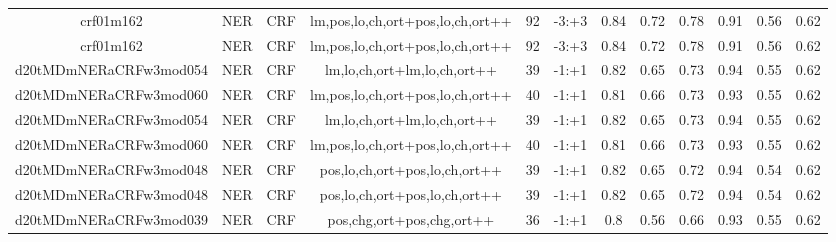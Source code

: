 \documentclass[a4paper]{article}
\begin{document}
\begin{landscape}
\begin{center}
\begin{tabular}{ |c|c|c|c|c|c|c|c|c|c|c|c|}
 
 	
 	\small{ crf01m162 } & \small{ NER} & \small{  CRF }  & lm,pos,lo,ch,ort+pos,lo,ch,ort++  &  92 &  \small{  -3:+3 }  &  0.84 & 0.72 & 0.78  &  0.91 & 0.56 & 0.62 \\
 	

 
 	
 	\small{ crf01m162 } & \small{ NER} & \small{  CRF }  & lm,pos,lo,ch,ort+pos,lo,ch,ort++  &  92 &  \small{  -3:+3 }  &  0.84 & 0.72 & 0.78  &  0.91 & 0.56 & 0.62 \\
 	

 
 	
 	\small{ d20tMDmNERaCRFw3mod054 } & \small{ NER} & \small{  CRF }  & lm,lo,ch,ort+lm,lo,ch,ort++  &  39 &  \small{  -1:+1 }  &  0.82 & 0.65 & 0.73  &  0.94 & 0.55 & 0.62 \\
 	

 
 	
 	\small{ d20tMDmNERaCRFw3mod060 } & \small{ NER} & \small{  CRF }  & lm,pos,lo,ch,ort+pos,lo,ch,ort++  &  40 &  \small{  -1:+1 }  &  0.81 & 0.66 & 0.73  &  0.93 & 0.55 & 0.62 \\
 	

 
 	
 	\small{ d20tMDmNERaCRFw3mod054 } & \small{ NER} & \small{  CRF }  & lm,lo,ch,ort+lm,lo,ch,ort++  &  39 &  \small{  -1:+1 }  &  0.82 & 0.65 & 0.73  &  0.94 & 0.55 & 0.62 \\
 	

 
 	
 	\small{ d20tMDmNERaCRFw3mod060 } & \small{ NER} & \small{  CRF }  & lm,pos,lo,ch,ort+pos,lo,ch,ort++  &  40 &  \small{  -1:+1 }  &  0.81 & 0.66 & 0.73  &  0.93 & 0.55 & 0.62 \\
 	

 
 	
 	\small{ d20tMDmNERaCRFw3mod048 } & \small{ NER} & \small{  CRF }  & pos,lo,ch,ort+pos,lo,ch,ort++  &  39 &  \small{  -1:+1 }  &  0.82 & 0.65 & 0.72  &  0.94 & 0.54 & 0.62 \\
 	

 
 	
 	\small{ d20tMDmNERaCRFw3mod048 } & \small{ NER} & \small{  CRF }  & pos,lo,ch,ort+pos,lo,ch,ort++  &  39 &  \small{  -1:+1 }  &  0.82 & 0.65 & 0.72  &  0.94 & 0.54 & 0.62 \\
 	

 
 	
 	\small{ d20tMDmNERaCRFw3mod039 } & \small{ NER} & \small{  CRF }  & pos,chg,ort+pos,chg,ort++  &  36 &  \small{  -1:+1 }  &  0.8 & 0.56 & 0.66  &  0.93 & 0.55 & 0.62 \\
 	


\end{tabular}
\end{center}
\end{landscape}
\end{document}
